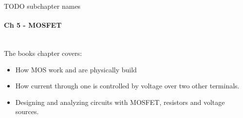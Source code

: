 TODO subchapter names

\paragraph{Ch 5 - MOSFET} \hfill \\
The books chapter covers:
\begin{itemize}
  \item How MOS  work and are physically build
  \item How current through one  is controlled by voltage
        over two other terminals.
  \item Designing and analyzing circuits with MOSFET, resistors and voltage
        sources.
\end{itemize}
